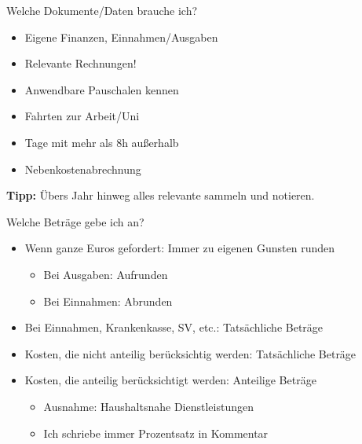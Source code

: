 \documentclass{beamer}
\begin{document}
			\begin{frame}{Welche Dokumente/Daten brauche ich?}
				\begin{itemize}
					\item Eigene Finanzen, Einnahmen/Ausgaben
					\item Relevante Rechnungen!
					\item Anwendbare Pauschalen kennen
					\item Fahrten zur Arbeit/Uni
					\item Tage mit mehr als 8h außerhalb
					\item Nebenkostenabrechnung
				\end{itemize}\n
				\textbf{Tipp:} Übers Jahr hinweg alles relevante sammeln und notieren.
			\end{frame}
				
			\begin{frame}{Welche Beträge gebe ich an?}
				\begin{itemize}
					\item Wenn ganze Euros gefordert: Immer zu eigenen Gunsten runden
					\begin{itemize}
						\item Bei Ausgaben: Aufrunden
						\item Bei Einnahmen: Abrunden
					\end{itemize}\pause
					\item Bei Einnahmen, Krankenkasse, SV, etc.: Tatsächliche Beträge
					\item Kosten, die nicht anteilig berücksichtig werden: Tatsächliche Beträge
					\item Kosten, die anteilig berücksichtigt werden: Anteilige Beträge
					\begin{itemize}
						\item Ausnahme: Haushaltsnahe Dienstleistungen
						\item Ich schriebe immer Prozentsatz in Kommentar
					\end{itemize}
				\end{itemize}
			\end{frame}
			
			
\end{document}
